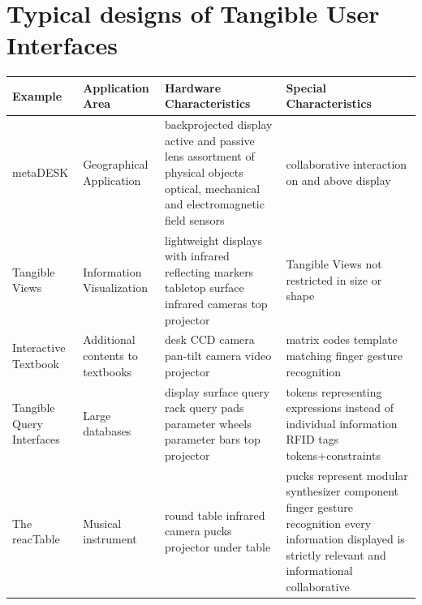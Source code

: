 \section{Typical designs of Tangible User Interfaces}

\begin{center}
\begin{table}[ht]
\small
\hfill{}
\begin{tabular}[ct]{|p{3 cm}|p{4 cm}|p{4.5 cm}|p{4.5 cm}|}
 \hline
 Example  & Application Area & Hardware Characteristics & Special Characteristics \\
 \hline
 \hline
 metaDESK & Geographical Application & backprojected display \newline active and passive lens \newline assortment of physical objects \newline optical, mechanical and electromagnetic field sensors & collaborative \newline interaction on and above display\\
 \hline
 Tangible Views & Information Visualization & lightweight displays with infrared reflecting markers \newline tabletop surface \newline infrared cameras \newline top projector & Tangible Views not restricted in size or shape \\
 \hline
 Interactive Textbook & Additional contents to textbooks & desk \newline CCD camera \newline pan-tilt camera \newline video projector & matrix codes \newline template matching \newline finger gesture recognition \\
 \hline
 Tangible Query Interfaces & Large databases & display surface \newline query rack \newline query pads \newline parameter wheels \newline parameter bars \newline top projector & tokens representing expressions instead of individual information \newline RFID tags \newline tokens+constraints \\
 \hline
 The reacTable & Musical instrument & round table \newline infrared camera \newline pucks \newline projector under table \newline & pucks represent modular synthesizer component \newline finger gesture recognition \newline every information displayed is strictly relevant and informational \newline collaborative\\

\end{tabular}
\end{table}
\end{center}
